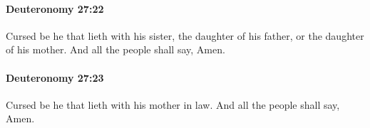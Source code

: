		\paragraph{Deuteronomy 27:22} %
			\label{DEUTERONOMY-27-22}

			Cursed be he that lieth with his sister, the daughter of his father, or the daughter of his mother. And all the people shall say, Amen.


		\paragraph{Deuteronomy 27:23} %
			\label{DEUTERONOMY-27-23}

			Cursed be he that lieth with his mother in law. And all the people shall say, Amen.


